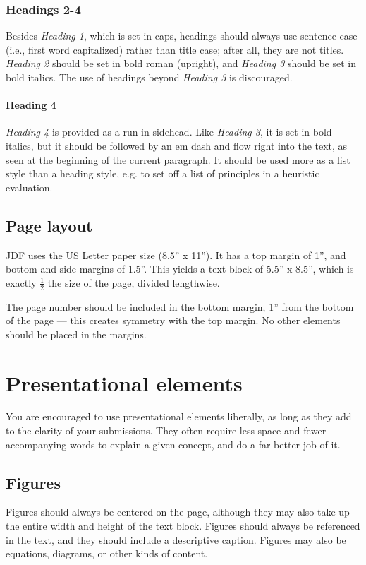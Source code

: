 {{{{\subsubsection{Headings 2-4}
Besides \emph{Heading 1}, which is set in caps, headings should always use sentence case (i.e., first word capitalized) rather than title case; after all, they are not titles. \emph{Heading 2} should be set in bold roman (upright), and \emph{Heading 3} should be set in bold italics. The use of headings beyond \emph{Heading 3} is discouraged.

\paragraph{Heading 4}
\emph{Heading 4} is provided as a run-in sidehead. Like \emph{Heading 3}, it is set in bold italics, but it should be followed by an em dash and flow right into the text, as seen at the beginning of the current paragraph. It should be used more as a list style than a heading style, e.g. to set off a list of principles in a heuristic evaluation.

\subsection{Page layout}
JDF uses the US Letter paper size (8.5'' x 11''). It has a top margin of 1'', and bottom and side margins of 1.5''. This yields a text block of 5.5'' x 8.5'', which is exactly $\frac{1}{2}$ the size of the page, divided lengthwise.

The page number should be included in the bottom margin, 1'' from the bottom of the page --- this creates symmetry with the top margin. No other elements should be placed in the margins.

\section{Presentational elements}
You are encouraged to use presentational elements liberally, as long as they add to the clarity of your submissions. They often require less space and fewer accompanying words to explain a given concept, and do a far better job of it.

\subsection{Figures}
Figures should always be centered on the page, although they may also take up the entire width and height of the text block. Figures should always be referenced in the text, and they should include a descriptive caption. Figures may also be equations, diagrams, or other kinds of content.

}}}}
